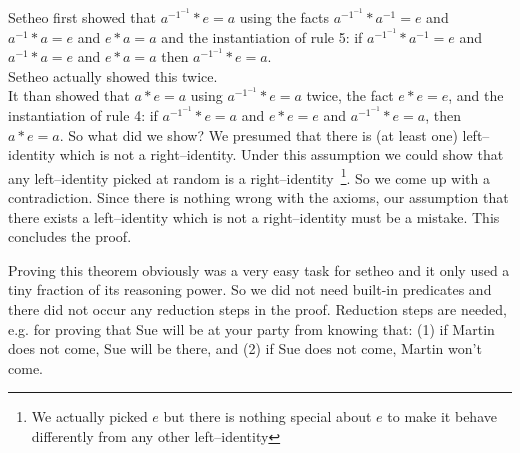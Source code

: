 Setheo first showed that $a^{-1^{-1}} * e = a$ using the facts $a^{-1^{-1}} * a^{-1} =e$ and $a^{-1} * a = e$
and $ e * a = a$ and the instantiation of rule 5: if $a^{-1^{-1}} * a^{-1} =e$ and $a^{-1} * a = e$ and $e * a = a$ then
$a^{-1^{-1}} * e = a$.\\
Setheo actually showed this twice.\\
It than showed that $a * e = a$ using $a^{-1^{-1}} *e = a$ twice, the fact $e * e = e$, and the instantiation of rule 4:
if $a^{-1^{-1}} * e = a$ and $e * e = e$ and $a^{-1^{-1}} * e = a$, then $a * e = a$.
So what did we show? We presumed that there is (at least one) left--identity
which is not a right--identity. Under this assumption we could show that
any left--identity picked at random is a right--identity~\footnote{We actually
picked $e$ but there is nothing special about $e$ to make it behave
differently from any other left--identity}. So we come up with a 
contradiction. Since there is nothing wrong with the axioms, our assumption 
that there exists a left--identity which is not a right--identity
must be a mistake. This concludes the proof.

Proving this theorem obviously was a very easy task for setheo and it only used a tiny fraction of its 
reasoning power. So we did not need built-in predicates and there did not occur any reduction steps in the proof.
Reduction steps are needed, e.g. for proving that Sue will be at your party from knowing that:
(1) if Martin does not come, Sue will be there, and
(2) if Sue does not come, Martin won't come.






%
%
%
%
%
%
%
%
%
%
%
%
%
%
%

